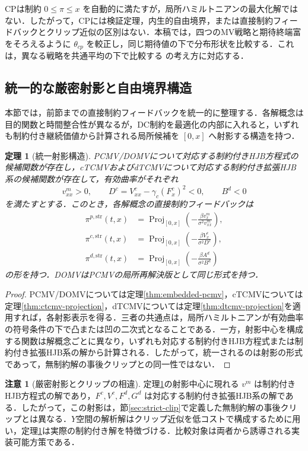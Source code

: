 \documentclass[10pt,a4paper]{article}
\theoremstyle{plain}
\newtheorem{theorem}{定理}
\theoremstyle{definition}
\newtheorem{remark}{注意}
\DeclareMathOperator{\Proj}{Proj}
\begin{document}
CPは制約 $0\leq\pi\leq x$ を自動的に満たすが，局所ハミルトニアンの最大化解ではない．したがって，CPには検証定理，内生的自由境界，または直接制約フィードバックとクリップ近似の区別はない．本稿では，四つのMV戦略と期待終端富をそろえるように $\theta_{cp}$ を較正し，同じ期待値の下で分布形状を比較する．これは，異なる戦略を共通平均の下で比較する \citet{vanStadenDangForsyth2021} の考え方に対応する．

\subsection{統一的な厳密射影と自由境界構造}
\label{sec:unified}

本節では，前節までの直接制約フィードバックを統一的に整理する．各解概念は目的関数と時間整合性が異なるが，DC制約を最適化の内部に入れると，いずれも制約付き継続価値から計算される局所候補を $[0,x]$ へ射影する構造を持つ．

\begin{theorem}[統一射影構造]
\label{thm:unified}
PCMV/DOMVについて対応する制約付きHJB方程式の候補関数が存在し，cTCMVおよびdTCMVについて対応する制約付き拡張HJB系の候補関数が存在して，有効曲率がそれぞれ
\[
  v_{xx}^m>0,
  \qquad
  D^c=V_{xx}^c-\gamma_c(F_x^c)^2<0,
  \qquad
  B^d<0
\]
を満たすとする．このとき，各解概念の直接制約フィードバックは
\begin{align*}
  \pi^{p,\mathrm{str}}(t,x)&=\Proj_{[0,x]}
  \left(-\frac{\beta v_x^m}{\sigma^2v_{xx}^m}\right),\\
  \pi^{c,\mathrm{str}}(t,x)&=\Proj_{[0,x]}
  \left(-\frac{\beta V_x^c}{\sigma^2D^c}\right),\\
  \pi^{d,\mathrm{str}}(t,x)&=\Proj_{[0,x]}
  \left(-\frac{\beta A^d}{\sigma^2B^d}\right)
\end{align*}
の形を持つ．DOMVはPCMVの局所再解決版として同じ形式を持つ．
\end{theorem}

\begin{proof}
PCMV/DOMVについては定理\ref{thm:embedded-pcmv}，cTCMVについては定理\ref{thm:ctcmv-projection}，dTCMVについては定理\ref{thm:dtcmv-projection}を適用すれば，各射影表示を得る．三者の共通点は，局所ハミルトニアンが有効曲率の符号条件の下で凸または凹の二次式となることである．一方，射影中心を構成する関数は解概念ごとに異なり，いずれも対応する制約付きHJB方程式または制約付き拡張HJB系の解から計算される．したがって，統一されるのは射影の形式であって，無制約解の事後クリップとの同一性ではない．
\end{proof}

\begin{remark}[厳密射影とクリップの相違]
定理\ref{thm:unified}の射影中心に現れる $v^m$ は制約付きHJB方程式の解であり，$F^c,V^c,F^d,G^d$ は対応する制約付き拡張HJB系の解である．したがって，この射影は，節\ref{sec:strict-clip}で定義した無制約解の事後クリップとは異なる．$Y$空間の解析解はクリップ近似を低コストで構成するために用い，定理\ref{thm:unified}は実際の制約付き解を特徴づける．比較対象は両者から誘導される実装可能方策である．
\end{remark}
\end{document}
